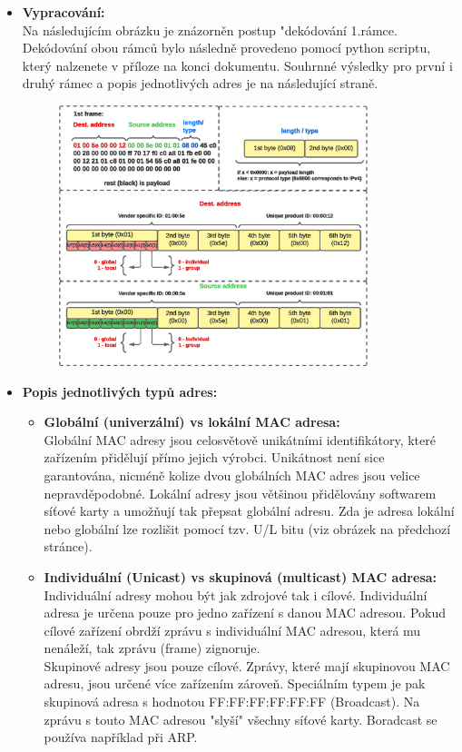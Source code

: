 \documentclass[10pt, a4paper]{article}%
\begin{document}
\begin{itemize}[label={}]
		\item \textbf{Vypracování:}\\
		Na následujícím obrázku je znázorněn postup "dekódování 1.rámce. Dekódování obou rámců bylo následně
		provedeno pomocí python scriptu, který nalzenete v příloze na konci dokumentu. Souhrnné
		výsledky pro první i druhý rámec a popis jednotlivých adres je na následující straně.
		\begin{figure}[ht!]
			\centering
			\includegraphics[width = 0.85\textwidth]{ethernet.eps}
		\end{figure}
		\clearpage

		\item \textbf{Popis jednotlivých typů adres:}
		\begin{itemize}[label=$\bullet$]
			\item \textbf{Globální (univerzální) vs lokální MAC adresa:}\\
			Globální MAC adresy jsou celosvětově unikátními identifikátory, které zařízením přidělují přímo jejich výrobci.
			Unikátnost není sice garantována, nicméně kolize dvou globálních MAC adres jsou velice nepravděpodobné.
			Lokální adresy jsou většinou přidělovány softwarem síťové karty a umožňují tak přepsat globální adresu. Zda je adresa
			lokální nebo globální lze rozlišit pomocí tzv. U/L bitu (viz obrázek na předchozí stránce).

			\item \textbf{Individuální (Unicast) vs skupinová (multicast) MAC adresa:}\\
			Individuální adresy mohou být jak zdrojové tak i cílové. Individuální adresa je určena pouze pro jedno zařízení
			s danou MAC adresou. Pokud cílové zařízení obrdží zprávu s individuální MAC adresou, která mu nenáleží, tak
			zprávu (frame) zignoruje.\\
			Skupinové adresy jsou pouze cílové. Zprávy, které mají skupinovou MAC adresu, jsou určené více zařízením zároveň.
			Speciálním typem je pak skupinová adresa s hodnotou FF:FF:FF:FF:FF:FF (Broadcast). Na zprávu s touto MAC adresou
			"slyší" všechny síťové karty. Boradcast se používa například při ARP. 
		\end{itemize}


\end{itemize}
\end{document}
